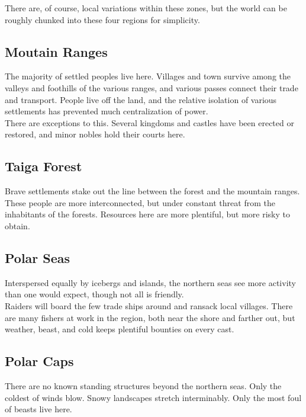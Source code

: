 \documentclass{article}
\begin{document}
\begin{multicols}{2}
There are, of course, local variations within these zones, but the world can be roughly chunked into these four regions for simplicity.
\subsection{Moutain Ranges}

The majority of settled peoples live here. Villages and town survive among the valleys and foothills of the various ranges, and various passes connect their trade and transport. People live off the land, and the relative isolation of various settlements has prevented much centralization of power. \\

There are exceptions to this. Several kingdoms and castles have been erected or restored, and minor nobles hold their courts here.

\subsection{Taiga Forest}

Brave settlements stake out the line between the forest and the mountain ranges. These people are more interconnected, but under constant threat from the inhabitants of the forests. Resources here are more plentiful, but more risky to obtain.

\subsection{Polar Seas} Interspersed equally by icebergs and islands, the northern seas see more activity than one would expect, though not all is friendly. \\

Raiders will board the few trade ships around and ransack local villages. There are many fishers at work in the region, both near the shore and farther out, but weather, beast, and cold keeps plentiful bounties on every cast. \\

\subsection{Polar Caps}

There are no known standing structures beyond the northern seas. Only the coldest of winds blow. Snowy landscapes stretch interminably. Only the most foul of beasts live here.


\end{multicols}
\end{document}
